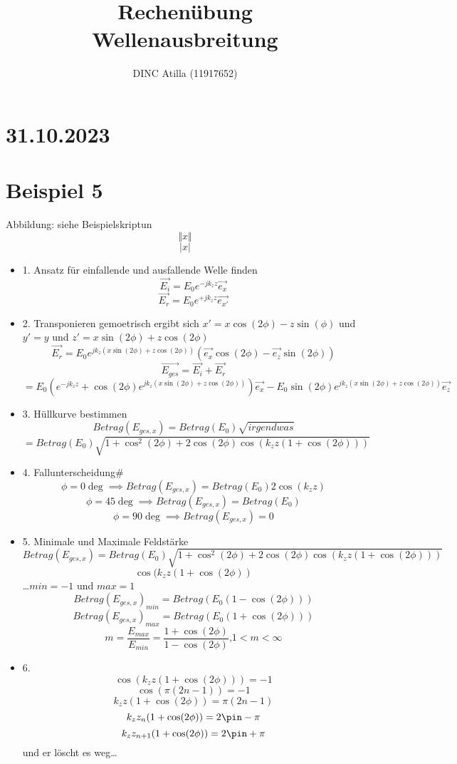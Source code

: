 \documentclass[a4paper]{article}
\title{Rechenübung\\Wellenausbreitung}
\author{DINC Atilla (11917652)}
\begin{document}
\normalsize
\maketitle

\section*{31.10.2023}
\section*{Beispiel 5}
Abbildung: siehe Beispielskriptun
\[ \Vert x\Vert\]
\[ \vert x \vert \]



\begin{itemize}
    \item 1. Ansatz für einfallende und ausfallende Welle finden
        \[ \vec{E_{i}}=E_{0}e^{-jk_{z}z} \vec{e_{x}} \]
        \[ \vec{E_{r}}=E_{0}e^{+jk_{z}z}\vec{e_{x'}} \]
    \item 2. Transponieren
        gemoetrisch ergibt sich $x'=x\cos(2\phi)-z\sin(\phi)$
        und $y'=y$ 
        und $z'=x\sin(2\phi)+z\cos(2\phi)$
        \[ \vec{E_{r}}=E_{0}e^{jk_{z}(x\sin(2\phi)+z\cos(2\phi))}(\vec{e_{x}}\cos(2\phi)-\vec{e_{z}}\sin(2\phi)) \]
        \[\vec{E_{ges}}=\vec{E_{i}}+\vec{E_{r}} \]
        \[ =E_{0}(e^{-jk_{z}z}+\cos(2\phi)e^{jk_{z}(x\sin(2\phi)+z\cos(2\phi))})\vec{e_{x}}
        -E_{0}\sin(2\phi)e^{jk_{z}(x\sin(2\phi)+z\cos(2\phi))}\vec{e_{z}}\]
    \item 3. Hüllkurve bestimmen
        \[ Betrag(E_{ges,x})=Betrag(E_{0})\sqrt{irgendwas}  \]
        \[ =Betrag(E_{0}) \sqrt{1+\cos^{2}(2\phi) + 2\cos(2\phi)\cos(k_{z}z(1+\cos(2\phi)))} \]
    \item 4. Fallunterscheidung#
        \[ \phi =0\deg \implies Betrag(E_{ges,x})=Betrag(E_{0})2\cos(k_{z}z)  \]
        \[ \phi =45\deg \implies Betrag(E_{ges,x})=Betrag(E_{0})  \]
        \[ \phi =90\deg \implies Betrag(E_{ges,x})=0  \]
    \item 5. Minimale und Maximale Feldstärke
        \[ Betrag(E_{ges,x})=Betrag(E_{0}) \sqrt{1+\cos^{2}(2\phi) + 2\cos(2\phi)\cos(k_{z}z(1+\cos(2\phi)))} \]
        \[\cos(k_{z}z(1+\cos(2\phi))\]
        \ldots $min = -1$ und  $max=1$
        \[ Betrag(E_{ges,x})_{min}=Betrag(E_{0}(1-\cos(2\phi)))\]
        \[ Betrag(E_{ges,x})_{max}=Betrag(E_{0}(1+\cos(2\phi)))\]
        \[ m=\frac{E_{max}}{E_{min}}=\frac{1+\cos(2\phi)}{1-\cos(2\phi)}\text{,} 1 <m < \infty \]
    \item 6.
        \[ \cos(k_{z}z(1+\cos(2\phi)))=-1 \]
        \[ \cos(\pi(2n-1))=-1 \]
        \[ k_{z}z(1+\cos(2\phi))=\pi(2n-1) \]
        \[ k_{z}z_{n}(1+\cos(2\phi))=2\pin-\pi \]
        \[ k_{z}z_{n+1}(1+\cos(2\phi))=2\pin+\pi \]
        und er löscht es weg\ldots
\end{itemize}
\end{document}
